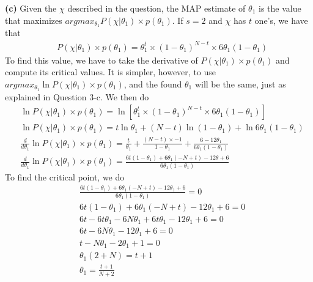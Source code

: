 \documentclass[leqno]{article}
\begin{document}
\noindent \textbf{(c)} Given the $\chi$ described in the question, the MAP estimate of $\theta_1$ is the value that maximizes 
 $argmax_{\theta_1} P(\chi|\theta_1) \times p(\theta_1)$. If $s = 2$ and $\chi$ has $t$ one's, we have that
\begin{equation*}
\begin{split}
&P(\chi|\theta_1) \times p(\theta_1) = \theta_1^t \times (1 - \theta_1)^{N - t} \times 6\theta_1(1 - \theta_1)
\end{split}  
\end{equation*} 
To find this value, we have to take the derivative of $P(\chi|\theta_1) \times p(\theta_1)$ and compute its critical values. It is simpler, however, 
to use $argmax_{\theta_1} \ln P(\chi|\theta_1) \times p(\theta_1)$, and the found $\theta_1$ will be the same, just as explained in Question 3-c. 
We then do
\begin{equation*}
\begin{split}
&\ln P(\chi|\theta_1) \times p(\theta_1) = \ln[\theta_1^t \times (1 - \theta_1)^{N - t} \times 6\theta_1(1 - \theta_1)]
\\
&\ln P(\chi|\theta_1) \times p(\theta_1) = t\ln \theta_1 + (N - t) \ln (1 - \theta_1) + \ln 6\theta_1(1 - \theta_1)
\\
&\frac{d}{d\theta_1}\ln P(\chi|\theta_1) \times p(\theta_1) = \frac{t}{\theta_1} + \frac{(N - t) \times -1}{1 - \theta_1} + \frac{6 - 12\theta_1}{6\theta_1(1 - \theta_1)}
\\
&\frac{d}{d\theta_1}\ln P(\chi|\theta_1) \times p(\theta_1) = \frac{6t(1 - \theta_1) + 6\theta_1(-N + t) - 12\theta + 6}{6\theta_1(1 - \theta_1)}
\end{split}  
\end{equation*} 
To find the critical point, we do
\begin{equation*}
\begin{split}
&\frac{6t(1 - \theta_1) + 6\theta_1(-N + t) - 12\theta_1 + 6}{6\theta_1(1 - \theta_1)} = 0
\\
& 6t(1 - \theta_1) + 6\theta_1(-N + t) - 12\theta_1 + 6 = 0
\\
& 6t - 6t\theta_1 - 6N\theta_1 + 6t\theta_1 -12\theta_1 + 6 = 0
\\
&6t - 6N\theta_1 -12\theta_1 + 6 = 0
\\
&t - N\theta_1 -2\theta_1 + 1 = 0
\\
&\theta_1(2 + N) = t + 1
\\
&\theta_1 = \frac{t + 1}{N + 2}
\end{split}  
\end{equation*} 
\end{document}
